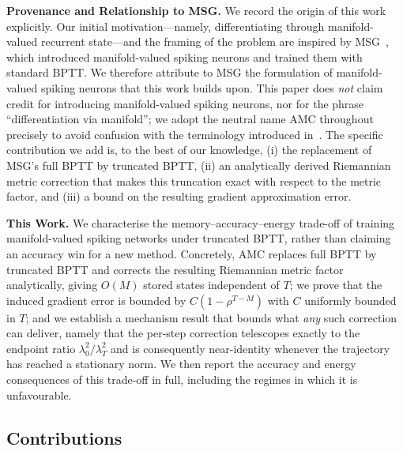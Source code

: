 \documentclass[a4paper,fleqn]{cas-dc}
\begin{document}
\textbf{Provenance and Relationship to MSG.} We record the origin of this work explicitly. Our initial motivation---namely, differentiating through manifold-valued recurrent state---and the framing of the problem are inspired by MSG~\citep{Sun24MSG}, which introduced manifold-valued spiking neurons and trained them with standard BPTT. We therefore attribute to MSG the formulation of manifold-valued spiking neurons that this work builds upon. This paper does \emph{not} claim credit for introducing manifold-valued spiking neurons, nor for the phrase ``differentiation via manifold''; we adopt the neutral name AMC throughout precisely to avoid confusion with the terminology introduced in~\citep{Sun24MSG}. The specific contribution we add is, to the best of our knowledge, (i) the replacement of MSG's full BPTT by truncated BPTT, (ii) an analytically derived Riemannian metric correction that makes this truncation exact with respect to the metric factor, and (iii) a bound on the resulting gradient approximation error.

\textbf{This Work.} We characterise the memory--accuracy--energy trade-off of training manifold-valued spiking networks under truncated BPTT, rather than claiming an accuracy win for a new method. Concretely, AMC replaces full BPTT by truncated BPTT and corrects the resulting Riemannian metric factor analytically, giving $O(M)$ stored states independent of $T$; we prove that the induced gradient error is bounded by $C(1-\rho^{T-M})$ with $C$ uniformly bounded in $T$; and we establish a mechanism result that bounds what \emph{any} such correction can deliver, namely that the per-step correction telescopes exactly to the endpoint ratio $\lambda_0^2/\lambda_T^2$ and is consequently near-identity whenever the trajectory has reached a stationary norm. We then report the accuracy and energy consequences of this trade-off in full, including the regimes in which it is unfavourable.

\subsection{Contributions}
\end{document}
